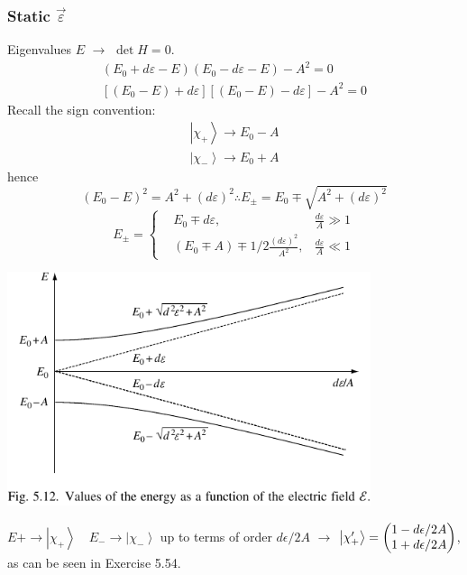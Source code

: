 \documentclass[12pt]{article}
\newcommand{\be}{\begin{equation}}
\newcommand{\ee}{\end{equation}}
\begin{document}
\subsubsection{Static $\vec{\varepsilon}$}

Eigenvalues $E$ $\to$ $\det H = 0$.
\[
\begin{array}{r}\left(E_{0}+d \varepsilon-E\right)\left(E_{0}-d \varepsilon-E\right)-A^{2}=0 \\ {\left[\left(E_{0}-E\right)+d \varepsilon\right]\left[\left(E_{0}-E\right)-d \varepsilon\right]-A^{2}=0}\end{array}
\]
Recall the sign convention:
\[
\begin{array}{l}
\left|\chi_{+}\right\rangle \rightarrow E_{0}-A \\ 
\left|\chi_{-}\right\rangle \rightarrow E_{0}+A
\end{array}
\]
hence
\be
\left(E_{0}-E\right)^{2}=A^{2}+(d \varepsilon)^{2} \therefore E_{\pm}=E_{0} \mp \sqrt{A^{2}+(d \varepsilon)^{2}}
\ee
\be
E_{\pm}=
\left\{
\begin{aligned}
&E_{0} \mp d \varepsilon, &\frac{d \varepsilon}{A}\gg1 \\
&\left(E_{0} \mp A\right) \mp 1 / 2 \frac{(d \varepsilon)^{2}}{A^{2}}, &\frac{d \varepsilon}{A}\ll1
\end{aligned}
\right.
\ee

\begin{center}
\includegraphics[width=0.8\textwidth]{Figures/ammoniaLevels.pdf}
\end{center}

$E+\rightarrow\left|\chi_{+}\right\rangle \quad E_{-} \rightarrow\left|\chi_{-}\right\rangle$ up to terms
of order $d\epsilon/2A$ $\to$ $\ket{\chi_+^{\prime}} =
\begin{pmatrix}
1-d\epsilon/2A\\1+d\epsilon/2A
\end{pmatrix}
$, as can be seen in Exercise 5.54.
\end{document}
